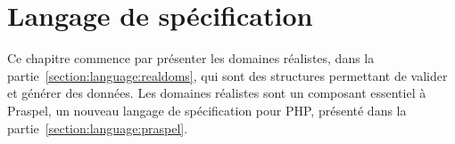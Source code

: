 \chapter{Langage de spécification}
\label{chapter:language}

\minitoc

Ce chapitre commence par présenter les domaines réalistes, dans la
partie~\ref{section:language:realdoms}, qui sont des structures permettant de
valider et générer des données. Les domaines réalistes sont un composant
essentiel à Praspel, un nouveau langage de spécification pour PHP, présenté dans
la partie~\ref{section:language:praspel}.

